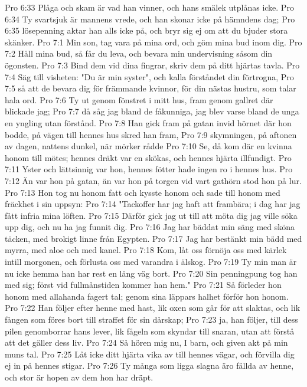 Pro 6:33  Plåga och skam är vad han vinner, och hans smälek utplånas icke.
Pro 6:34  Ty svartsjuk är mannens vrede, och han skonar icke på hämndens dag;
Pro 6:35  lösepenning aktar han alls icke på, och bryr sig ej om att du bjuder stora skänker.
Pro 7:1  Min son, tag vara på mina ord, och göm mina bud inom dig.
Pro 7:2  Håll mina bud, så får du leva, och bevara min undervisning såsom din ögonsten.
Pro 7:3  Bind dem vid dina fingrar, skriv dem på ditt hjärtas tavla.
Pro 7:4  Säg till visheten: "Du är min syster", och kalla förståndet din förtrogna,
Pro 7:5  så att de bevara dig för främmande kvinnor, för din nästas hustru, som talar hala ord.
Pro 7:6  Ty ut genom fönstret i mitt hus, fram genom gallret där blickade jag;
Pro 7:7  då såg jag bland de fåkunniga, jag blev varse bland de unga en yngling utan förstånd.
Pro 7:8  Han gick fram på gatan invid hörnet där hon bodde, på vägen till hennes hus skred han fram,
Pro 7:9  skymningen, på aftonen av dagen, nattens dunkel, när mörker rådde
Pro 7:10  Se, då kom där en kvinna honom till mötes; hennes dräkt var en skökas, och hennes hjärta illfundigt.
Pro 7:11  Yster och lättsinnig var hon, hennes fötter hade ingen ro i hennes hus.
Pro 7:12  Än var hon på gatan, än var hon på torgen vid vart gathörn stod hon på lur.
Pro 7:13  Hon tog nu honom fatt och kysste honom och sade till honom med fräckhet i sin uppsyn:
Pro 7:14  "Tackoffer har jag haft att frambära; i dag har jag fått infria mina löften.
Pro 7:15  Därför gick jag ut till att möta dig jag ville söka upp dig, och nu ha jag funnit dig.
Pro 7:16  Jag har bäddat min säng med sköna täcken, med brokigt linne från Egypten.
Pro 7:17  Jag har bestänkt min bädd med myrra, med aloe och med kanel.
Pro 7:18  Kom, låt oss förnöja oss med kärlek intill morgonen, och förlusta oss med varandra i älskog.
Pro 7:19  Ty min man är nu icke hemma han har rest en lång väg bort.
Pro 7:20  Sin penningpung tog han med sig; först vid fullmånstiden kommer han hem."
Pro 7:21  Så förleder hon honom med allahanda fagert tal; genom sina läppars halhet förför hon honom.
Pro 7:22  Han följer efter henne med hast, lik oxen som går för att slaktas, och lik fången som föres bort till straffet för sin dårskap;
Pro 7:23  ja, han följer, till dess pilen genomborrar hans lever, lik fågeln som skyndar till snaran, utan att förstå att det gäller dess liv.
Pro 7:24  Så hören mig nu, I barn, och given akt på min muns tal.
Pro 7:25  Låt icke ditt hjärta vika av till hennes vägar, och förvilla dig ej in på hennes stigar.
Pro 7:26  Ty många som ligga slagna äro fällda av henne, och stor är hopen av dem hon har dräpt.
